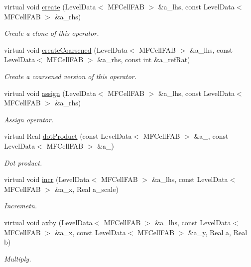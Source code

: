 \begin{DoxyCompactItemize}
virtual void \hyperlink{classmfconductivityop_a3d7a8dd4ef5dde76b4c4a457095db927}{create} (Level\+Data$<$ M\+F\+Cell\+F\+AB $>$ \&a\+\_\+lhs, const Level\+Data$<$ M\+F\+Cell\+F\+AB $>$ \&a\+\_\+rhs)
\begin{DoxyCompactList}\small\item\em Create a clone of this operator. \end{DoxyCompactList}\item 
virtual void \hyperlink{classmfconductivityop_af1cc9f4e71300e27f43409682ee8e8b3}{create\+Coarsened} (Level\+Data$<$ M\+F\+Cell\+F\+AB $>$ \&a\+\_\+lhs, const Level\+Data$<$ M\+F\+Cell\+F\+AB $>$ \&a\+\_\+rhs, const int \&a\+\_\+ref\+Rat)
\begin{DoxyCompactList}\small\item\em Create a coarsened version of this operator. \end{DoxyCompactList}\item 
virtual void \hyperlink{classmfconductivityop_af6c7ad55be22eeafcf519d757110a05e}{assign} (Level\+Data$<$ M\+F\+Cell\+F\+AB $>$ \&a\+\_\+lhs, const Level\+Data$<$ M\+F\+Cell\+F\+AB $>$ \&a\+\_\+rhs)
\begin{DoxyCompactList}\small\item\em Assign operator. \end{DoxyCompactList}\item 
virtual Real \hyperlink{classmfconductivityop_addde7a701d33493cbb33d1df189af4b7}{dot\+Product} (const Level\+Data$<$ M\+F\+Cell\+F\+AB $>$ \&a\+\_, const Level\+Data$<$ M\+F\+Cell\+F\+AB $>$ \&a\+\_)
\begin{DoxyCompactList}\small\item\em Dot product. \end{DoxyCompactList}\item 
virtual void \hyperlink{classmfconductivityop_aad6b8751503cf8c531e6cbe7a0114cf9}{incr} (Level\+Data$<$ M\+F\+Cell\+F\+AB $>$ \&a\+\_\+lhs, const Level\+Data$<$ M\+F\+Cell\+F\+AB $>$ \&a\+\_\+x, Real a\+\_\+scale)
\begin{DoxyCompactList}\small\item\em Incremetn. \end{DoxyCompactList}\item 
virtual void \hyperlink{classmfconductivityop_a86533ddec3986e87e4fa7b7ba030c6c2}{axby} (Level\+Data$<$ M\+F\+Cell\+F\+AB $>$ \&a\+\_\+lhs, const Level\+Data$<$ M\+F\+Cell\+F\+AB $>$ \&a\+\_\+x, const Level\+Data$<$ M\+F\+Cell\+F\+AB $>$ \&a\+\_\+y, Real a, Real b)
\begin{DoxyCompactList}\small\item\em Multiply. \end{DoxyCompactList}\item 

\end{DoxyCompactItemize}
